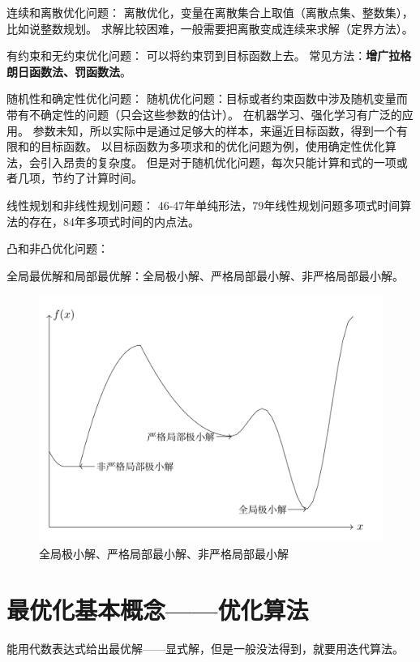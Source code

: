 \documentclass{article}
\begin{document}
连续和离散优化问题：
离散优化，变量在离散集合上取值（离散点集、整数集），比如说整数规划。
求解比较困难，一般需要把离散变成连续来求解（定界方法）。

有约束和无约束优化问题：
可以将约束罚到目标函数上去。
常见方法：\textbf{增广拉格朗日函数法、罚函数法}。

随机性和确定性优化问题：
随机优化问题：目标或者约束函数中涉及随机变量而带有不确定性的问题（只会这些参数的估计）。
在机器学习、强化学习有广泛的应用。
参数未知，所以实际中是通过足够大的样本，来逼近目标函数，得到一个有限和的目标函数。
以目标函数为多项求和的优化问题为例，使用确定性优化算法，会引入昂贵的复杂度。
但是对于随机优化问题，每次只能计算和式的一项或者几项，节约了计算时间。

线性规划和非线性规划问题：
46-47年单纯形法，79年线性规划问题多项式时间算法的存在，84年多项式时间的内点法。

凸和非凸优化问题：

全局最优解和局部最优解：全局极小解、严格局部最小解、非严格局部最小解。
\begin{figure}[h]
    \centering
    \includegraphics[scale=0.3]{5.png}
    \caption{全局极小解、严格局部最小解、非严格局部最小解}
    \end{figure}    
\section{最优化基本概念——优化算法}
能用代数表达式给出最优解——显式解，但是一般没法得到，就要用迭代算法。
\end{document}
